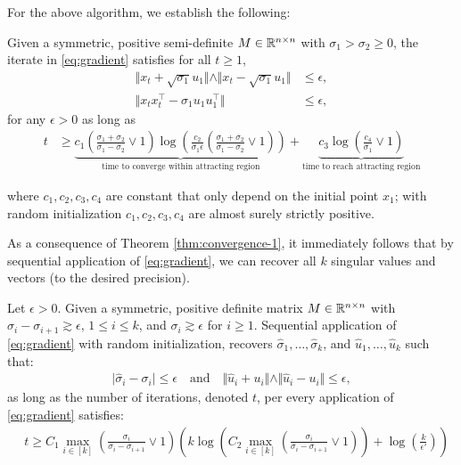 For the above algorithm, we establish the following:
\begin{theorem}\label{thm:convergence-1}
Given a symmetric, positive semi-definite $M \in \mathbb{R}^{n\times n}$ with $\sigma_1 > \sigma_2 \geq 0$, the
iterate in \eqref{eq:gradient} satisfies for all $t \ge 1$,  
\begin{align}
\Vert x_{t} + \sqrt{\sigma_1} u_1 \Vert \wedge \Vert x_t - \sqrt{\sigma_1} u_1 \Vert &\le \epsilon, \\
\Vert x_{t}x_{t}^\top   - \sigma_1 u_1 u_1^\top \Vert & \le \epsilon,
\end{align}
for any $\epsilon > 0$ as long as 
\begin{align}
t & \ge \underbrace{c_1 \left(\frac{\sigma_1 + \sigma_2}{\sigma_1 - \sigma_2} \vee 1 \right) \log\left( \frac{c_2}{\sigma_1 \epsilon} \left(\frac{\sigma_1 + \sigma_2}{\sigma_1 - \sigma_2} \vee 1 \right)\right)}_{\textrm{time to converge within attracting region}}  + \underbrace{c_3\log\left(\frac{c_4}{\sigma_1} \vee 1 \right)}_{\textrm{time to reach attracting region}}
\end{align}

where $c_1, c_2, c_3, c_4$ are constant that only depend on the initial point $x_1$;  
with random initialization $c_1, c_2, c_3, c_4$ are almost surely strictly positive. 
\end{theorem}
As a consequence of Theorem \ref{thm:convergence-1}, it immediately follows that by sequential application of \eqref{eq:gradient}, we can recover
all $k$ singular values and vectors (to the desired precision). 

\begin{theorem}\label{thm:bigtheorem}
    Let $\epsilon > 0$.  Given a symmetric, positive definite matrix $M \in \mathbb{R}^{n\times n}$ with $\sigma_i - \sigma_{i+1} \gtrsim \epsilon$, $ 1 \le i \le  k$, and $\sigma_i \gtrsim \epsilon$ for $i \ge 1$. Sequential application of \eqref{eq:gradient} with random initialization, recovers  $\hat{\sigma}_1, \dots, \hat{\sigma}_k$, and $\hat{u}_1, \dots, \hat{u}_k$ such that: 
    \begin{align}
        \vert \hat{\sigma}_i - \sigma_i \vert \le \epsilon \quad \text{and} \quad \Vert \hat{u}_i + u_i\Vert \wedge \Vert \hat{u}_i - u_i \Vert \le \epsilon,
    \end{align}
    as long as the number of iterations, denoted $t$, per every application of \eqref{eq:gradient} satisfies:  
    \begin{align}
        & t \ge C_1  \max_{i\in[k]}\left( \frac{\sigma_i }{\sigma_i - \sigma_{i+1}} \vee 1 \right) \left( k \log\left( C_2 \max_{i\in[k]}\left( \frac{\sigma_i}{\sigma_i - \sigma_{i+1}} \vee 1\right)\right)  
        + \log\left( \frac{k}{\epsilon'}\right) \right)
    \end{align}   
\end{theorem}




